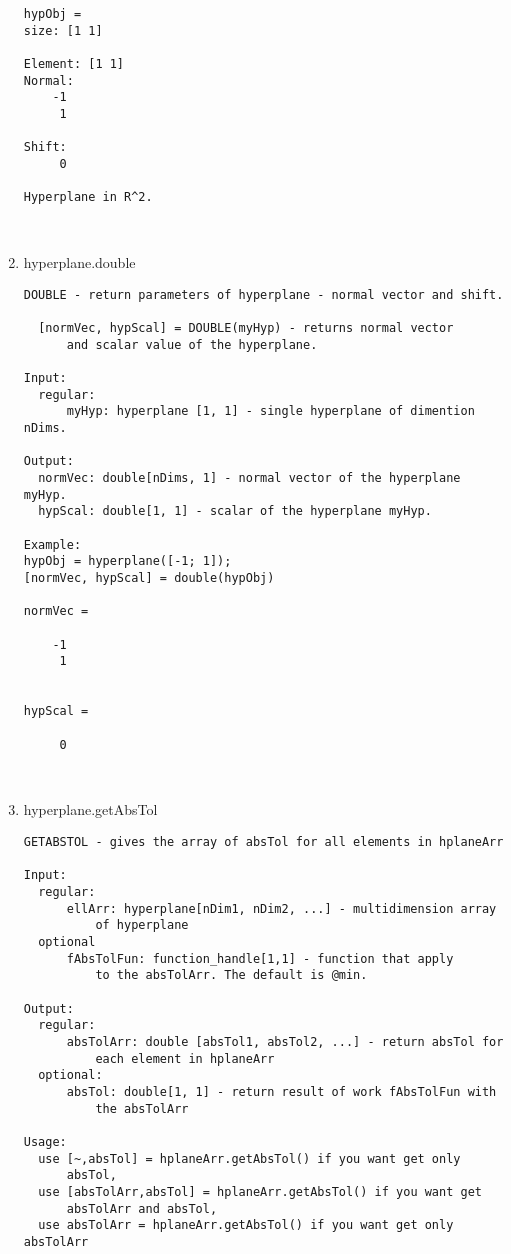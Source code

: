 \begin{enumerate}
\begin{lstlisting}
hypObj =
size: [1 1]

Element: [1 1]
Normal:
    -1
     1

Shift:
     0

Hyperplane in R^2.



\end{lstlisting}
\fontfamily{\familydefault}
\selectfont
\item {hyperplane.double}
\selectfont
\begin{lstlisting}
DOUBLE - return parameters of hyperplane - normal vector and shift.

  [normVec, hypScal] = DOUBLE(myHyp) - returns normal vector
      and scalar value of the hyperplane.

Input:
  regular:
      myHyp: hyperplane [1, 1] - single hyperplane of dimention nDims.

Output:
  normVec: double[nDims, 1] - normal vector of the hyperplane myHyp.
  hypScal: double[1, 1] - scalar of the hyperplane myHyp.

Example:
hypObj = hyperplane([-1; 1]);
[normVec, hypScal] = double(hypObj)

normVec =

    -1
     1


hypScal =

     0



\end{lstlisting}
\fontfamily{\familydefault}
\selectfont
\item {hyperplane.getAbsTol}
\selectfont
\begin{lstlisting}
GETABSTOL - gives the array of absTol for all elements in hplaneArr

Input:
  regular:
      ellArr: hyperplane[nDim1, nDim2, ...] - multidimension array
          of hyperplane
  optional
      fAbsTolFun: function_handle[1,1] - function that apply
          to the absTolArr. The default is @min.

Output:
  regular:
      absTolArr: double [absTol1, absTol2, ...] - return absTol for
          each element in hplaneArr
  optional:
      absTol: double[1, 1] - return result of work fAbsTolFun with
          the absTolArr

Usage:
  use [~,absTol] = hplaneArr.getAbsTol() if you want get only
      absTol,
  use [absTolArr,absTol] = hplaneArr.getAbsTol() if you want get
      absTolArr and absTol,
  use absTolArr = hplaneArr.getAbsTol() if you want get only absTolArr


\end{lstlisting}
\end{enumerate}

